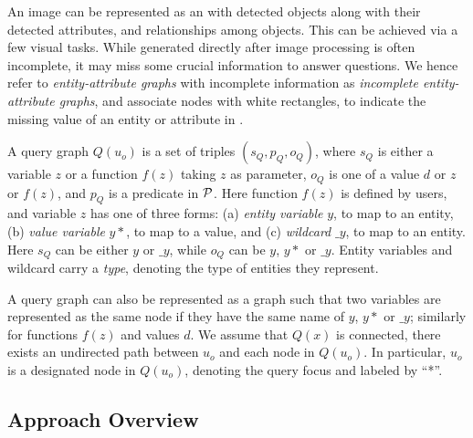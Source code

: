 An image can be represented as an  with detected objects along with their detected attributes, and relationships among objects. This can be achieved via a few visual tasks. While  generated directly after image processing is often incomplete, \ie it may miss some crucial information to answer questions. We hence refer to {\em entity-attribute graphs} with incomplete information as {\em incomplete entity-attribute graphs}, and associate nodes with white rectangles, to indicate the missing value of an entity or attribute in . 

  A query graph $Q(u_o)$ is a set of triples
$(s_Q, p_Q, o_Q)$, where $s_Q$ is either a variable $z$ or a function $f(z)$ taking $z$ as parameter, $o_Q$ is one of a value $d$ or $z$ or $f(z)$, and $p_Q$ is a predicate in ${\cal P}$. Here function $f(z)$ is defined by users, and variable $z$ has one
of three forms: (a) {\em entity variable} $y$, to map to an entity, (b)
{\em value variable} $y*$, to map to a value, and (c) {\em wildcard} $\_y$, to
map to an entity. Here $s_Q$ can be either $y$ or $\_y$, while $o_Q$ can
be $y$, $y*$ or $\_y$. Entity variables and wildcard carry a {\em type},
denoting the type of entities they represent. 

A query graph can also be represented as a graph such
that two variables are represented as the same node if they
have the same name of $y$, $y*$ or $\_y$; similarly for functions $f(z)$ and values $d$.
We assume \kwlog that $Q(x)$ is connected, \ie there exists
an undirected path between $u_o$ and each node in $Q(u_o)$.
In particular, $u_o$ is a designated node in $Q(u_o)$, denoting the query focus and labeled by ``*''. %



\subsection{Approach Overview}
\label{sec-architecture}

